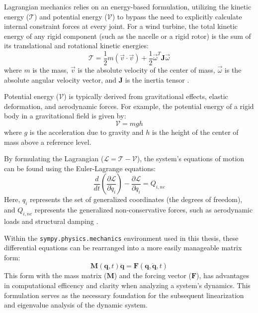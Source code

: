 \documentclass[onecolumn,draftcls]{IEEEtran}
\begin{document}
Lagrangian mechanics relies on an energy-based formulation, utilizing the kinetic energy ($\mathcal{T}$) and potential energy ($\mathcal{V}$) to bypass the need to explicitly calculate internal constraint forces at every joint. For a wind turbine, the total kinetic energy of any rigid component (such as the nacelle or a rigid rotor) is the sum of its translational and rotational kinetic energies:
\begin{equation}
    \mathcal{T} = \frac{1}{2}m(\vec{v} \cdot \vec{v}) + \frac{1}{2}\vec{\omega}^T \mathbf{J} \vec{\omega}
\end{equation}
where $m$ is the mass, $\vec{v}$ is the absolute velocity of the center of mass, $\vec{\omega}$ is the absolute angular velocity vector, and $\mathbf{J}$ is the inertia tensor \cite{Branlard2025notes}.

Potential energy ($\mathcal{V}$) is typically derived from gravitational effects, elastic deformation, and aerodynamic forces. For example, the potential energy of a rigid body in a gravitational field is given by:
\begin{equation}
    \mathcal{V} = mgh
\end{equation}
where $g$ is the acceleration due to gravity and $h$ is the height of the center of mass above a reference level.

By formulating the Lagrangian ($\mathcal{L} = \mathcal{T} - \mathcal{V}$), the system's equations of motion can be found using the Euler-Lagrange equations:
\begin{equation}
    \label{eq:lagrange}
    \frac{d}{dt}\left(\frac{\partial\mathcal{L}}{\partial\dot{q}_i}\right)-\frac{\partial\mathcal{L}}{\partial q_i}=Q_{i,nc}
\end{equation}
Here, $q_i$ represents the set of generalized coordinates (the degrees of freedom), and $Q_{i,nc}$ represents the generalized non-conservative forces, such as aerodynamic loads and structural damping \cite{Branlard2025notes}.

Within the \texttt{sympy.physics.mechanics} environment used in this thesis, these differential equations can be rearranged into a more easily manageable matrix form:
\begin{equation}
    \mathbf{M}(\mathbf{q}, t) \ddot{\mathbf{q}} = \mathbf{F}(\mathbf{q}, \dot{\mathbf{q}}, t)
\end{equation}
This form with the mass matrix ($\mathbf{M}$) and the forcing vector ($\mathbf{F}$), has advantages in computational efficency and clarity when analyzing a system's dynamics. This formulation serves as the necessary foundation for the subsequent linearization and eigenvalue analysis of the dynamic system.
\end{document}
